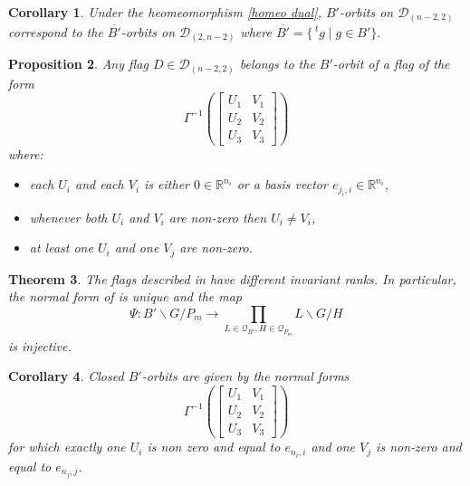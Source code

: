 \documentclass[pdftex]{sigma}
\numberwithin{equation}{section}
\newtheorem{Theorem}{Theorem}[section]
\newtheorem{Corollary}[Theorem]{Corollary}
\newtheorem{Proposition}[Theorem]{Proposition}
\theoremstyle{definition}
\newcommand{\R}{\mathbb{R}}
\newcommand{\D}{\mathcal{D}}
\theoremstyle{plain}
\theoremstyle{plain}
\theoremstyle{plain}
\theoremstyle{plain}
\begin{document}
\begin{Corollary}
	Under the heomeomorphism \eqref{homeo dual}, $B'$-orbits on $\D_{(n-2,2)}$ correspond to the $\overline{B'}$-orbits on $\D_{(2,n-2)}$ where 
	$\overline{B'} = \{\,^tg \mid g \in B'\}.$
\end{Corollary}

\begin{Proposition}{\label{orbits II2}}
	Any flag $D \in \D_{(n-2,2)}$ belongs to the $B'$-orbit of a flag of the form
	\begin{equation*}
		\Gamma^{-1}\left(\begin{bmatrix}
	U_1 & V_1 \\
	U_2 & V_2 \\
	U_3 & V_3
\end{bmatrix}\right)
	\end{equation*}
	where:
	\begin{itemize}[label = --]
		\item each $U_i$ and each $V_i$ is either $0 \in \R^{n_i}$ or a basis vector $e_{j_i,i} \in \R^{n_i}$,
		\item whenever both $U_i$ and $V_i$ are non-zero then $U_i \neq V_i$,
		\item at least one $U_i$ and one $V_j$ are non-zero.
	\end{itemize}
\end{Proposition}

\begin{Theorem}
	The flags described in  have different invariant ranks. In particular, the normal form of  is unique and the map
	\begin{equation*}
		\Psi : B'\backslash G/P_{\underline m} \to \displaystyle \prod_{L \in \mathcal Q_{B'}, H \in \mathcal Q_{P_{\underline m}}} L\backslash G/H
	\end{equation*}
	is injective.
\end{Theorem}

\begin{Corollary}
	Closed $B'$-orbits are given by the normal forms
	\begin{equation*}
		\Gamma^{-1}\left(\begin{bmatrix}
	U_1 & V_1 \\
	U_2 & V_2 \\
	U_3 & V_3
\end{bmatrix}\right)
	\end{equation*}
for which exactly one $U_i$ is non zero and equal to $e_{n_i,i}$ and one $V_j$ is non-zero and equal to $e_{n_j,j}$.
\end{Corollary}
\end{document}
